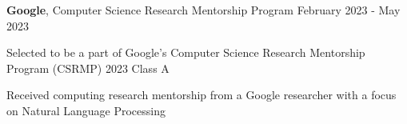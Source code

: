 
\begin{cventries}

  \cventry
    {\textbf{Google}, Computer Science Research Mentorship Program}
    {}
    {}
    {February 2023 - May 2023}
    {
      \begin{cvitems}
        \item{Selected to be a part of Google’s Computer Science Research Mentorship Program (CSRMP) 2023 Class A}
        \item{Received computing research mentorship from a Google researcher with a focus on Natural Language Processing}
      \end{cvitems}
    }

\end{cventries}
